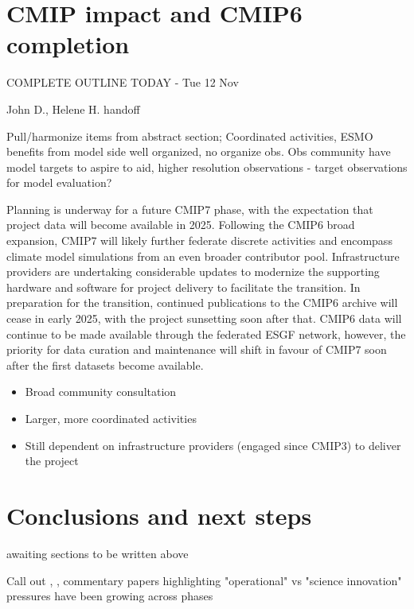 \documentclass[gmd, preprint]{copernicus}
\def\cred#1{{\color{red}#1}}
\def\cblue#1{{\color{blue}#1}}
\begin{document}
\section{CMIP impact and CMIP6 completion}
\label{sec:CMIP6Completion}
\cblue{COMPLETE OUTLINE TODAY - Tue 12 Nov}

\cred{John D., Helene H. handoff}

\cred{Pull/harmonize items from abstract section; Coordinated activities, ESMO benefits from model side well organized, no organize obs. Obs community have model targets to aspire to aid, higher resolution observations - target observations for model evaluation?}

Planning is underway for a future CMIP7 phase, with the expectation that project data will become available in 2025. Following the CMIP6 broad expansion, CMIP7 will likely further federate discrete activities and encompass climate model simulations from an even broader contributor pool. Infrastructure providers are undertaking considerable updates to modernize the supporting hardware and software for project delivery to facilitate the transition. In preparation for the transition, continued publications to the CMIP6 archive will cease in early 2025, with the project sunsetting soon after that. CMIP6 data will continue to be made available through the federated ESGF network, however, the priority for data curation and maintenance will shift in favour of CMIP7 soon after the first datasets become available.

\cred{
\begin{itemize}
	\item Broad community consultation
	\item Larger, more coordinated activities
	\item Still dependent on infrastructure providers (engaged since CMIP3) to deliver the project
\end{itemize}
}


\section{Conclusions and next steps} %
\label{sec:Conclusions}
\cred{awaiting sections to be written above}

\cred{Call out \citet{shukla_strategies_2009,shukla_toward_2010}, \citep{jakob_need_2023}, \citep{stevens_perspective_2024} commentary papers highlighting "operational" vs "science innovation" pressures have been growing across phases}
\end{document}
